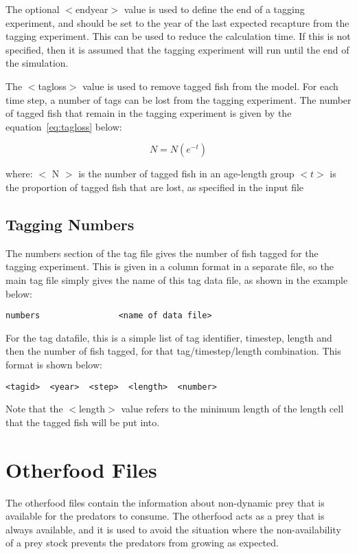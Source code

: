 \documentclass[10pt,twoside]{book}
\begin{document}
\bigskip
The optional $<$endyear$>$ value is used to define the end of a tagging experiment, and should be set to the year of the last expected recapture from the tagging experiment.  This can be used to reduce the calculation time.  If this is not specified, then it is assumed that the tagging experiment will run until the end of the simulation.

\newpage %
The $<$tagloss$>$ value is used to remove tagged fish from the model.  For each time step, a number of tags can be lost from the tagging experiment.  The number of tagged fish that remain in the tagging experiment is given by the equation~\ref{eq:tagloss} below:

\begin{equation}\label{eq:tagloss}
N = N (e^{-t})
\end{equation}

where:\newline
$<$ N $>$ is the number of tagged fish in an age-length group\newline
$<t>$ is the proportion of tagged fish that are lost, as specified in the input file

\section{Tagging Numbers}\label{sec:tagnumbers}
The numbers section of the tag file gives the number of fish tagged for the tagging experiment.  This is given in a column format in a separate file, so the main tag file simply gives the name of this tag data file, as shown in the example below:

{\small\begin{verbatim}
numbers                <name of data file>
\end{verbatim}}

For the tag datafile, this is a simple list of tag identifier, timestep, length and then the number of fish tagged, for that tag/timestep/length combination.  This format is shown below:

{\small\begin{verbatim}
<tagid>  <year>  <step>  <length>  <number>
\end{verbatim}}

Note that the $<$length$>$ value refers to the minimum length of the length cell that the tagged fish will be put into.

\chapter{Otherfood Files}\label{chap:other}
The otherfood files contain the information about non-dynamic prey that is available for the predators to consume.  The otherfood acts as a prey that is always available, and it is used to avoid the situation where the non-availability of a prey stock prevents the predators from growing as expected.
\end{document}
